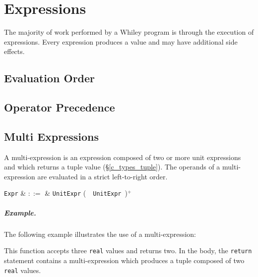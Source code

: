 
\chapter{Expressions}
The majority of work performed by a Whiley program is through the execution of \glspl{expression}.  Every expression produces a \gls{value} and may have additional side effects.

\section{Evaluation Order}

\section{Operator Precedence}


\section{Multi Expressions}
\label{c_expr_tuple}
A multi-expression is an expression composed of two or more unit expressions and which returns a tuple value (\S\ref{c_types_tuple}).  The operands of a multi-expression are evaluated in a strict left-to-right order.

\begin{syntax}
  \verb+Expr+ & $::=$ & \verb+UnitExpr+ \big(\ \token{,}\ \verb+UnitExpr+\ \big)$^+$ \\
\end{syntax}

\paragraph{Example.}  The following example illustrates the use of a multi-expression:



This function accepts three \lstinline{real} values and returns two.  In the body, the \lstinline{return} statement contains a multi-expression which produces a tuple composed of two \lstinline{real} values.


